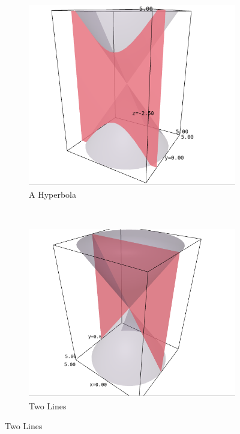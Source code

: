 \documentclass{article}
\theoremstyle{definition}
\begin{document}
\begin{figure}[H]
\begin{subfigure}[b]{0.3\textwidth}
\includegraphics[width=\textwidth]{Selection_053}
\caption{A Hyperbola}
\label{fig:gull}
\end{subfigure}
~ %
\begin{subfigure}[b]{0.3\textwidth}
\includegraphics[width=\textwidth]{Selection_055}
\caption{Two Lines}
\label{fig:tiger}
\end{subfigure}

\end{figure}
\end{document}
